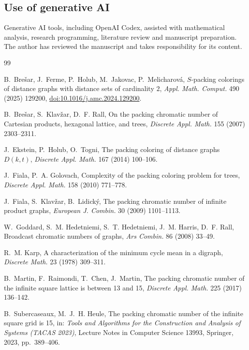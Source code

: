 \documentclass[11pt,reqno]{amsart}
\theoremstyle{plain}
\theoremstyle{plain}
\theoremstyle{plain}
\begin{document}
\subsection*{Use of generative AI}
Generative AI tools, including OpenAI Codex, assisted with mathematical
analysis, research programming, literature review and manuscript preparation.
The author has reviewed the manuscript and takes responsibility for its content.
\enlargethispage{2\baselineskip}
\begin{thebibliography}{99}

B.~Bre\v{s}ar, J.~Ferme, P.~Holub, M.~Jakovac, P.~Melicharov\'a,
\newblock $S$-packing colorings of distance graphs with distance sets of cardinality $2$,
\newblock \emph{Appl. Math. Comput.} 490 (2025) 129200,
\href{https://doi.org/10.1016/j.amc.2024.129200}{doi:10.1016/j.amc.2024.129200}.

B.~Bre\v{s}ar, S.~Klav\v{z}ar, D.~F. Rall,
\newblock On the packing chromatic number of Cartesian products, hexagonal lattice, and trees,
\newblock \emph{Discrete Appl. Math.} 155 (2007) 2303--2311.

J.~Ekstein, P.~Holub, O.~Togni,
\newblock The packing coloring of distance graphs $D(k,t)$,
\newblock \emph{Discrete Appl. Math.} 167 (2014) 100--106.

J.~Fiala, P.~A. Golovach,
\newblock Complexity of the packing coloring problem for trees,
\newblock \emph{Discrete Appl. Math.} 158 (2010) 771--778.

J.~Fiala, S.~Klav\v{z}ar, B.~Lidick\'y,
\newblock The packing chromatic number of infinite product graphs,
\newblock \emph{European J. Combin.} 30 (2009) 1101--1113.

W.~Goddard, S.~M. Hedetniemi, S.~T. Hedetniemi, J.~M. Harris, D.~F. Rall,
\newblock Broadcast chromatic numbers of graphs,
\newblock \emph{Ars Combin.} 86 (2008) 33--49.

R.~M. Karp,
\newblock A characterization of the minimum cycle mean in a digraph,
\newblock \emph{Discrete Math.} 23 (1978) 309--311.

B.~Martin, F.~Raimondi, T.~Chen, J.~Martin,
\newblock The packing chromatic number of the infinite square lattice is between 13 and 15,
\newblock \emph{Discrete Appl. Math.} 225 (2017) 136--142.

B.~Subercaseaux, M.~J.~H. Heule,
\newblock The packing chromatic number of the infinite square grid is 15,
\newblock in: \emph{Tools and Algorithms for the Construction and Analysis of Systems (TACAS 2023)},
  Lecture Notes in Computer Science 13993, Springer, 2023, pp.~389--406.


\end{thebibliography}
\end{document}
